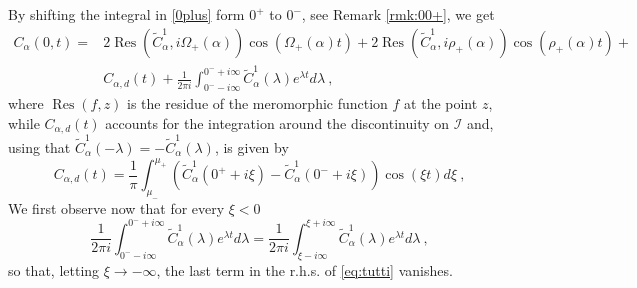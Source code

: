 \documentclass[11pt]{article}
\numberwithin{equation}{section}
\DeclareMathOperator{\Res}{Res}
\numberwithin{theorem}{section}
\def\tilde#1{\widetilde{#1}}
\begin{document}
By shifting the integral in \eqref{0plus} form $0^+$ to $0^-$, see Remark \ref{rmk:00+}, we get
\begin{equation}\label{eq:tutti}
\begin{aligned}
 C_\alpha(0,t)=&2\Res(\tilde C^1_\alpha,i\Omega_+(\alpha))\cos(\Omega_+(\alpha)t)+
2\Res(\tilde C^1_\alpha,i\rho_+(\alpha))\cos(\rho_+(\alpha)t)+\\
&C_{\alpha,d}(t)+\frac{1}{2\pi i}\int_{0^--i\infty}^{0^-+i\infty}\tilde
C^1_\alpha(\lambda)e^{\lambda t}d\lambda\ ,
\end{aligned}
\end{equation}
where $\Res(f,z)$ is the residue of the meromorphic function $f$ at the point $z$, while $C_{\alpha,d}(t)$ accounts for
the integration around the discontinuity on $\mathcal I$ and, using that $\tilde C^1_\alpha(-\lambda)=-\tilde
C^1_\alpha(\lambda)$, is given by
\begin{equation}\label{eq:Cd}
 C_{\alpha,d}(t)=\frac{1}{\pi}\int_{\mu_-}^{\mu_+}
\left(\tilde C^1_\alpha(0^++i\xi)-\tilde
C^1_\alpha(0^-+i\xi)\right)\cos(\xi t)d\xi\ ,
\end{equation}
We first observe now that for every $\xi<0$
\[
 \frac{1}{2\pi i}\int_{0^--i\infty}^{0^-+i\infty}\tilde
C^1_\alpha(\lambda)e^{\lambda t}d\lambda=
\frac{1}{2\pi i}\int_{\xi-i\infty}^{\xi+i\infty}\tilde
C^1_\alpha(\lambda)e^{\lambda t}d\lambda\ ,
\]
so that, letting $\xi\to-\infty$, the last term in the r.h.s. of \eqref{eq:tutti} vanishes.
\end{document}
